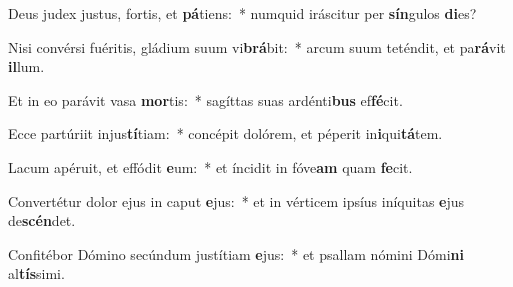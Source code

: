 \item Deus judex justus, fortis, et \textbf{pá}tiens:~* numquid iráscitur per \textbf{sín}gulos \textbf{di}es?
\item Nisi convérsi fuéritis, gládium suum vi\textbf{brá}bit:~* arcum suum teténdit, et pa\textbf{rá}vit \textbf{il}lum.
\item Et in eo parávit vasa \textbf{mor}tis:~* sagíttas suas ardénti\textbf{bus} ef\textbf{fé}cit.
\item Ecce partúriit injus\textbf{tí}tiam:~* concépit dolórem, et péperit in\textbf{i}qui\textbf{tá}tem.
\item Lacum apéruit, et effódit \textbf{e}um:~* et íncidit in fóve\textbf{am} quam \textbf{fe}cit.
\item Convertétur dolor ejus in caput \textbf{e}jus:~* et in vérticem ipsíus iníquitas \textbf{e}jus de\textbf{scén}det.
\item Confitébor Dómino secúndum justítiam \textbf{e}jus:~* et psallam nómini Dómi\textbf{ni} al\textbf{tís}simi.
